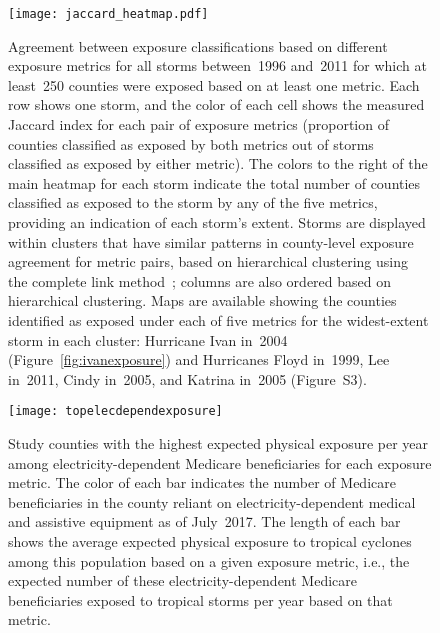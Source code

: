 \clearpage

\begin{figure}%
\centering 
\texttt{[image: jaccard\_heatmap.pdf]} 
\caption{Agreement between exposure classifications based on different
         exposure metrics for all storms between~1996 and~2011 for which 
	 at least~250 counties were exposed based on at least one metric.
	 Each row shows one storm, and the color of each cell shows the 
	 measured Jaccard index for each pair of exposure metrics 
	 (proportion of counties classified as exposed by both metrics out 
	 of storms classified as exposed by either metric). The colors to the 
	 right of the main heatmap for each storm indicate the total number of 
	 counties classified as exposed to the storm by any of the five metrics, 
	 providing an indication of each storm's extent. Storms are displayed 
	 within clusters that have similar patterns in county-level exposure 
	 agreement for metric pairs, based on hierarchical clustering using the 
	 complete link method~\parencite{murtagh2012algorithms}; columns are also 
	 ordered based on hierarchical clustering. Maps are available showing the 
	 counties identified as exposed under each of five metrics for the widest-extent 
	 storm in each cluster: Hurricane Ivan in~2004 (Figure~\ref{fig:ivanexposure}) 
	 and Hurricanes Floyd in~1999, Lee in~2011, Cindy in~2005, and Katrina 
	 in~2005 (Figure~S3).
} 
\label{fig:jaccard}
\end{figure}

\clearpage

\begin{figure*}%
\centering
\texttt{[image: topelecdependexposure]}
\caption{Study counties with the highest expected physical exposure per year among
	 electricity-dependent Medicare beneficiaries for each exposure metric. 
	 The color of each bar indicates the number of Medicare beneficiaries in the 
	 county reliant on electricity-dependent medical and assistive equipment as 
	 of July~2017. The length of each bar shows the average expected physical exposure
	 to tropical cyclones among this population based on a given exposure metric, i.e., 
	 the expected number of these electricity-dependent Medicare beneficiaries exposed 
	 to tropical storms per year based on that metric.}
\label{fig:topelecdependexposure}
\end{figure*}


